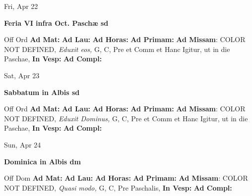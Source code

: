 \documentclass[10pt]{book}
\begin{document}
\begin{center}
\begin{minipage}{3.5in}
\vspace{2em}
\begin{center}Fri, Apr 22
\end{center}
\textbf{ \large Feria VI infra Oct. Paschæ
\textnormal{\normalsize sd}}

\begin{justify}Off Ord
\textbf{Ad Mat: }
\textbf{Ad Lau: }
\textbf{Ad Horas: }
\textbf{Ad Primam: }\textbf{Ad Missam}: COLOR NOT DEFINED, \textit{Eduxit eos,} G, C, Pre et Comm et Hanc Igitur, ut in die Paschae, 
\textbf{In Vesp: }
\textbf{Ad Compl: }
\end{justify}
\end{minipage}
\end{center}

\begin{center}
\begin{minipage}{3.5in}
\vspace{2em}
\begin{center}Sat, Apr 23
\end{center}
\textbf{ \large Sabbatum in Albis
\textnormal{\normalsize sd}}

\begin{justify}Off Ord
\textbf{Ad Mat: }
\textbf{Ad Lau: }
\textbf{Ad Horas: }
\textbf{Ad Primam: }\textbf{Ad Missam}: COLOR NOT DEFINED, \textit{Eduxit Dominus,} G, C, Pre et Comm et Hanc Igitur, ut in die Paschae, 
\textbf{In Vesp: }
\textbf{Ad Compl: }
\end{justify}
\end{minipage}
\end{center}

\begin{center}
\begin{minipage}{3.5in}
\vspace{2em}
\begin{center}Sun, Apr 24
\end{center}
\textbf{ \large Dominica in Albis
\textnormal{\normalsize dm}}

\begin{justify}Off Dom
\textbf{Ad Mat: }
\textbf{Ad Lau: }
\textbf{Ad Horas: }
\textbf{Ad Primam: }\textbf{Ad Missam}: COLOR NOT DEFINED, \textit{Quasi modo,} G, C, Pre Paschalis, 
\textbf{In Vesp: }
\textbf{Ad Compl: }
\end{justify}
\end{minipage}
\end{center}
\end{document}
